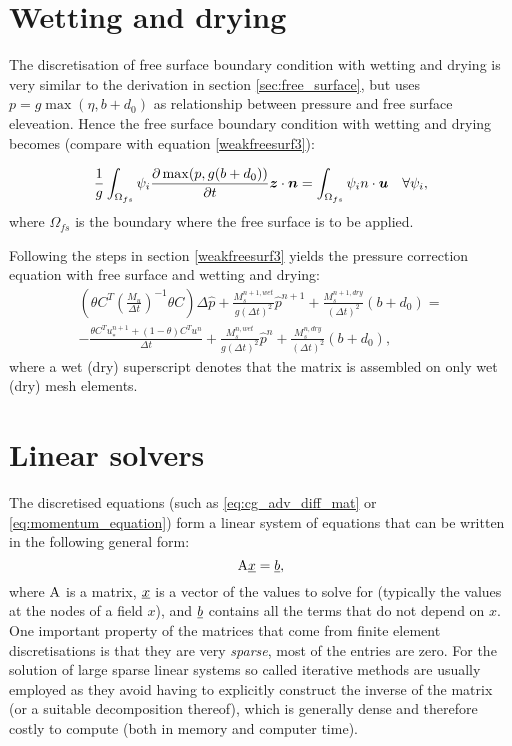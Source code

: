 \section{Wetting and drying}\label{sec:wetting_and_drying}
The discretisation of free surface boundary condition with wetting and drying is very similar to the derivation in section \ref{sec:free_surface}, 
but uses $p=g\max(\eta, b+d_0)$ as relationship between pressure and free surface eleveation. Hence the free surface boundary condition with wetting and drying becomes (compare with equation \ref{weakfreesurf3}):

\begin{equation}\label{weakfreesurf3_wd}
\frac{1}{g} \int_{\Omega_{fs}} {\psi_i }\frac{\partial \max(p, g(b+d_0))}{\partial t}{\mbox{\boldmath$z$}} \cdot {\mbox{\boldmath$n$}}=\int_{\Omega_{fs}} \psi_i {n \cdot {\mbox{\boldmath$u$}}} \quad
  \forall \psi_i,
\end{equation}
where $\Omega_{fs}$ is the boundary where the free surface is to be applied. 

Following the steps in section \ref{weakfreesurf3} yields the pressure correction equation with free surface and wetting and drying:
\begin{equation}
\begin{split}
\left(\theta C^T(\frac{M_u}{\Delta t})^{-1} \theta C\right) \Delta \hat p + \frac{M^{n+1, wet}_s}{g(\Delta t)^2} \hat p^{n+1}+ \frac{M^{n+1, dry}_s}{(\Delta t)^2}(b+d_0) = \\
-\frac{\theta C^T u_*^{n+1} + (1-\theta)C^Tu^n}{\Delta t}+\frac{M^{n, wet}_s}{g(\Delta t)^2} \hat p^{n}+ \frac{M^{n, dry}_s}{(\Delta t)^2}(b+d_0),
\end{split}
\end{equation}
where a wet (dry) superscript denotes that the matrix is assembled on only wet (dry) mesh elements.


\section{Linear solvers} \label{ND_Linear_solvers}
The discretised equations (such as \eqref{eq:cg_adv_diff_mat} or \eqref{eq:momentum_equation}) form
a linear system of equations that can be written
in the following general form:
\begin{equation*}
  \mathrm{A}\underline{x}=\underline{b},
\end{equation*}
where $\mathrm{A}$ is a matrix, $\underline{x}$ is a vector of the values
to solve for (typically the values at the nodes of a field $x$),
and $\underline{b}$ contains all the terms that do not depend on
$x$. One important property of the matrices that come from
finite element discretisations is that they are very \emph{sparse},
\ie most of the entries are zero. For the solution of large
sparse linear systems so called iterative methods are usually employed
as they
avoid having to explicitly construct the inverse of the matrix
(or a suitable decomposition thereof),
which is generally dense and therefore costly to compute
(both in memory and computer time).

